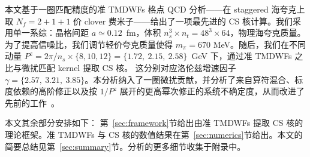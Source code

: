 本文基于一圈匹配精度的准 TMDWFs 格点 QCD 分析——在 staggered 海夸克上取 $N_f=2+1+1$ 价 clover 费米子——给出了一项最先进的 CS 核计算。我们采用单一系综：晶格间距 $a\simeq0.12$~fm，体积 $n_s^3\times n_t=48^3\times64$，物理海夸克质量。为了提高信噪比，我们调节轻价夸克质量使得 $m_\pi = 670$ MeV。随后，我们在不同动量 $P^z=2\pi/n_s\times\{8,10,12\}=\{1.72,~2.15,~2.58\}$~GeV 下，通过准 TMDWFs 之比与微扰匹配 kernel 提取 CS 核。
这分别对应洛伦兹增速因子 $\gamma=\{2.57,~3.21,~3.85\}$。本分析纳入了一圈微扰贡献，并分析了来自算符混合、标度依赖的高阶修正以及按 $1/P^z$ 展开的更高幂次修正的系统不确定度，从而改进了先前的工作~\cite{LatticeParton:2020uhz,Li:2021wvl}。

本文其余部分安排如下：
第~\ref{sec:framework}节给出由准 TMDWFs 提取 CS 核的理论框架。准 TMDWFs 与 CS 核的数值结果在第~\ref{sec:numerics}节给出。本文的简要总结见第~\ref{sec:summary}节。分析的更多细节收集于附录中。
